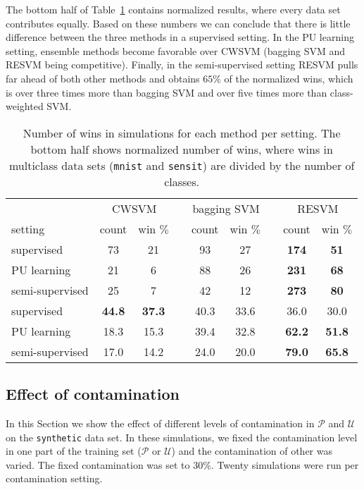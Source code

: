 \documentclass[preprint,elsarticle-num,12pt]{elsarticle}
\begin{document}
The bottom half of Table~\ref{table:wins} contains normalized results, where every data set contributes equally. Based on these numbers we can conclude that there is little difference between the three methods in a supervised setting. In the PU learning setting, ensemble methods become favorable over CWSVM (bagging SVM and RESVM being competitive). Finally, in the semi-supervised setting RESVM pulls far ahead of both other methods and obtains $65\%$ of the normalized wins, which is over three times more than bagging SVM and over five times more than class-weighted SVM.

\begin{table}[!h]
\centering
\begin{tabular}{lcccccccc}
\toprule
    & \multicolumn{2}{c}{CWSVM} & & \multicolumn{2}{c}{bagging SVM} & & \multicolumn{2}{c}{RESVM}\\ \cline{2-3} \cline{5-6} \cline{8-9}
setting         & count & win $\%$ & & count & win $\%$ & & count & win $\%$ \\
\midrule    
supervised      & 73    & 21 & & 93 & 27 & & \textbf{174} & \textbf{51} \\
PU learning     & 21     & 6  & & 88 & 26 & & \textbf{231} & \textbf{68} \\
semi-supervised  & 25    & 7  & & 42 & 12 & & \textbf{273} & \textbf{80}\\
\midrule
supervised      & \textbf{44.8} & \textbf{37.3} & & 40.3 & 33.6 & & 36.0 & 30.0 \\
PU learning     & 18.3  & 15.3 & & 39.4 & 32.8 & & \textbf{62.2} & \textbf{51.8} \\
semi-supervised  & 17.0  & 14.2 & & 24.0 & 20.0 & & \textbf{79.0} & \textbf{65.8} \\
\bottomrule
\end{tabular}
\caption{Number of wins in simulations for each method per setting. The bottom half shows normalized number of wins, where wins in multiclass data sets (\texttt{mnist} and \texttt{sensit}) are divided by the number of classes.}
\label{table:wins}
\end{table}


\subsection{Effect of contamination} \label{varycontamination}
In this Section we show the effect of different levels of contamination in $\mathcal{P}$ and $\mathcal{U}$ on the \texttt{synthetic} data set. In these simulations, we fixed the contamination level in one part of the training set ($\mathcal{P}$ or $\mathcal{U}$) and the contamination of other was varied. The fixed contamination was set to $30\%$. Twenty simulations were run per contamination setting.
\end{document}
